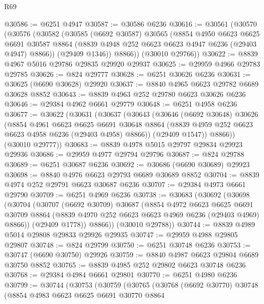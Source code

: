 \begin{lexlean}{R69}
\begin{coremodule}
{@30586 := @6251 @4947
@30587 := @30586 @6236
@30616 := @30561
    (@30570
      (@30576
        (@30582
          (@30585
            (@6692 @30587)
            @30565
            (@8854
              @4950
              @6623
              @6625
              @6691
              @30587
              @8864
              (@8839 @4948 @252 @6623 @6623 @4947 @6236 (@29403 @4947) @8866))
            (@29409 @1346))
          @8866))
      (@30010 @29766))
@30622 := @8839 @4967 @5016 @29786 @29835 @29920 @29937
@30625 := @29959 @4966 @29783 @29785
@30626 := @824 @29777
@30628 := @6251 @30626 @6236
@30631 := @30625 (@6690 @30628) @29920
@30637 := @8840 @4965 @6623 @29782 @6689 @30628 @8852
@30643 := @8839 @4963 @252 @29780 @6623 @30626 @6236
@30646 := @29384 @4962 @6661 @29779
@30648 := @6251 @4958 @6236
@30677 := @30622
    (@30631
      (@30637
        (@30643
          (@30646
            (@6692 @30648)
            @30626
            (@8854
              @4961
              @6623
              @6625
              @6691
              @30648
              @8864
              (@8839 @4959 @252 @6623 @6623 @4958 @6236 (@29403 @4958) @8866))
            (@29409 @1547))
          @8866))
      (@30010 @29777))
@30683 := @8839 @4978 @5015 @29797 @29834 @29923 @29936
@30686 := @29959 @4977 @29794 @29796
@30687 := @824 @29788
@30689 := @6251 @30687 @6236
@30692 := @30686 (@6690 @30689) @29923
@30698 := @8840 @4976 @6623 @29793 @6689 @30689 @8852
@30704 := @8839 @4974 @252 @29791 @6623 @30687 @6236
@30707 := @29384 @4973 @6661 @29790
@30709 := @6251 @4969 @6236
@30738 := @30683
    (@30692
      (@30698
        (@30704
          (@30707
            (@6692 @30709)
            @30687
            (@8854
              @4972
              @6623
              @6625
              @6691
              @30709
              @8864
              (@8839 @4970 @252 @6623 @6623 @4969 @6236 (@29403 @4969) @8866))
            (@29409 @1778))
          @8866))
      (@30010 @29788))
@30744 := @8839 @4989 @5014 @29808 @29833 @29926 @29935
@30747 := @29959 @4988 @29805 @29807
@30748 := @824 @29799
@30750 := @6251 @30748 @6236
@30753 := @30747 (@6690 @30750) @29926
@30759 := @8840 @4987 @6623 @29804 @6689 @30750 @8852
@30765 := @8839 @4985 @252 @29802 @6623 @30748 @6236
@30768 := @29384 @4984 @6661 @29801
@30770 := @6251 @4980 @6236
@30799 := @30744
    (@30753
      (@30759
        (@30765
          (@30768
            (@6692 @30770)
            @30748
            (@8854
              @4983
              @6623
              @6625
              @6691
              @30770
              @8864
}
\end{coremodule}
\end{lexlean}
